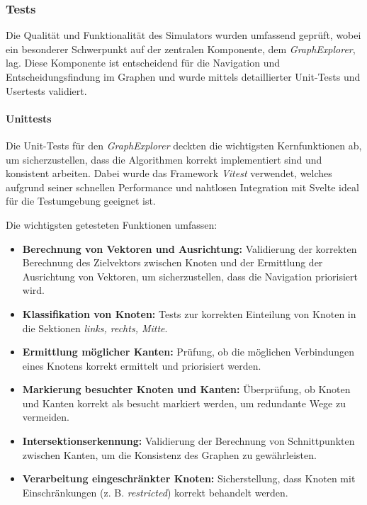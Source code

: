 \documentclass[main.tex]{subfiles} %
\begin{document}
\subsubsection{Tests}

Die Qualität und Funktionalität des Simulators wurden umfassend geprüft, wobei ein besonderer Schwerpunkt auf der zentralen Komponente, dem \textit{GraphExplorer}, lag. Diese Komponente ist entscheidend für die Navigation und Entscheidungsfindung im Graphen und wurde mittels detaillierter Unit-Tests und Usertests validiert.

\paragraph{Unittests}

Die Unit-Tests für den \textit{GraphExplorer} deckten die wichtigsten Kernfunktionen ab, um sicherzustellen, dass die Algorithmen korrekt implementiert sind und konsistent arbeiten. Dabei wurde das Framework \textit{Vitest} verwendet, welches aufgrund seiner schnellen Performance und nahtlosen Integration mit Svelte ideal für die Testumgebung geeignet ist.

Die wichtigsten getesteten Funktionen umfassen:
\begin{itemize}
    \item \textbf{Berechnung von Vektoren und Ausrichtung:} Validierung der korrekten Berechnung des Zielvektors zwischen Knoten und der Ermittlung der Ausrichtung von Vektoren, um sicherzustellen, dass die Navigation priorisiert wird.
    \item \textbf{Klassifikation von Knoten:} Tests zur korrekten Einteilung von Knoten in die Sektionen \textit{links, rechts, Mitte}.
    \item \textbf{Ermittlung möglicher Kanten:} Prüfung, ob die möglichen Verbindungen eines Knotens korrekt ermittelt und priorisiert werden.
    \item \textbf{Markierung besuchter Knoten und Kanten:} Überprüfung, ob Knoten und Kanten korrekt als besucht markiert werden, um redundante Wege zu vermeiden.
    \item \textbf{Intersektionserkennung:} Validierung der Berechnung von Schnittpunkten zwischen Kanten, um die Konsistenz des Graphen zu gewährleisten.
    \item \textbf{Verarbeitung eingeschränkter Knoten:} Sicherstellung, dass Knoten mit Einschränkungen (z. B. \textit{restricted}) korrekt behandelt werden.
\end{itemize}
\end{document}
